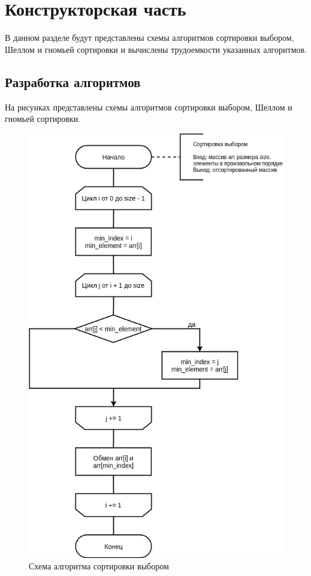 \chapter{Конструкторская часть}

В данном разделе будут представлены схемы алгоритмов сортировки выбором, Шеллом и гномьей сортировки и вычислены трудоемкости указанных алгоритмов.

\section{Разработка алгоритмов}

На рисунках представлены схемы алгоритмов сортировки выбором, Шеллом и гномьей сортировки.

\begin{figure}[H]
	\begin{center}
		\includegraphics[scale=0.4]{img/selection_sort.png}
	\end{center}
	\captionsetup{justification=centering}
	\caption{Схема алгоритма сортировки выбором}
	\label{img:selection_sort}
\end{figure}

